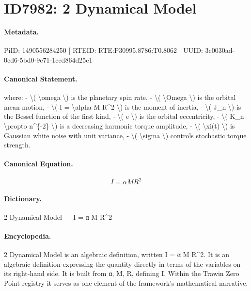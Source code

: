 \section*{ID7982: 2 Dynamical Model}
\paragraph{Metadata.}
PiID: 1490556284250 | RTEID: RTE:P30995.8786:T0.8062 | UUID: 3c0030ad-0cd6-5bd0-9c71-1ced864d25c1

\paragraph{Canonical Statement.}
where: - \textbackslash{}( \textbackslash{}omega \textbackslash{}) is the planetary spin rate, - \textbackslash{}( \textbackslash{}Omega \textbackslash{}) is the orbital mean motion, - \textbackslash{}( I = \textbackslash{}alpha M R\textasciicircum{}2 \textbackslash{}) is the moment of inertia, - \textbackslash{}( J\_n \textbackslash{}) is the Bessel function of the first kind, - \textbackslash{}( e \textbackslash{}) is the orbital eccentricity, - \textbackslash{}( K\_n \textbackslash{}propto n\textasciicircum{}\{-2\} \textbackslash{}) is a decreasing harmonic torque amplitude, - \textbackslash{}( \textbackslash{}xi(t) \textbackslash{}) is Gaussian white noise with unit variance, - \textbackslash{}( \textbackslash{}sigma \textbackslash{}) controls stochastic torque strength.

\paragraph{Canonical Equation.}
\[
I = \alpha M R^2
\]

\paragraph{Dictionary.}
2 Dynamical Model — I = α M R\textasciicircum{}2

\paragraph{Encyclopedia.}
2 Dynamical Model is an algebraic definition, written I = α M R\textasciicircum{}2. It is an algebraic definition expressing the quantity directly in terms of the variables on its right-hand side. It is built from α, M, R, defining I. Within the Trawin Zero Point registry it serves as one element of the framework's mathematical narrative.
